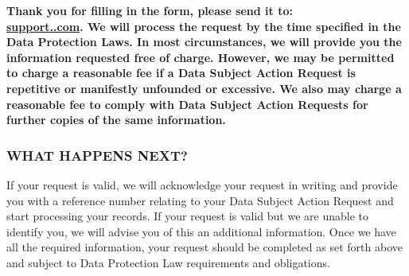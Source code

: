 \documentclass[11pt, oneside]{article}   	%
\begin{document}
\textbf{Thank you for filling in the form, please send it to: \\
\href{mailto:support.\slug@zipoapps.com}{support.\slug@zipoapps.com}. We will process
the request by the time specified in the Data Protection Laws. In most circumstances, we will
provide you the information requested free of charge. However, we may be permitted to charge
a reasonable fee if a Data Subject Action Request is repetitive or manifestly unfounded or
excessive. We also may charge a reasonable fee to comply with Data Subject Action Requests
for further copies of the same information.}

\subsubsection*{WHAT HAPPENS NEXT?}
If your request is valid, we will acknowledge your request in writing and provide you with a
reference number relating to your Data Subject Action Request and start processing your records.
If your request is valid but we are unable to identify you, we will advise you of this an
additional information. Once we have all the required information, your request should be
completed as set forth above and subject to Data Protection Law requirements and obligations. 
\end{document}
